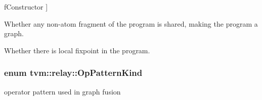 \begin{Desc}
\begin{description}
{f\+Constructor\hypertarget{namespacetvm_1_1relay_a926750aeda977340aa82bceac863fc9eaff71be930d862c312a5ae263e71167a2}{}\label{namespacetvm_1_1relay_a926750aeda977340aa82bceac863fc9eaff71be930d862c312a5ae263e71167a2}
}]\item[{\em 
f\+Match\hypertarget{namespacetvm_1_1relay_a926750aeda977340aa82bceac863fc9ea53a8eba57c4a3abd37b4c96fb98bf61b}{}\label{namespacetvm_1_1relay_a926750aeda977340aa82bceac863fc9ea53a8eba57c4a3abd37b4c96fb98bf61b}
}]\item[{\em 
f\+Graph\hypertarget{namespacetvm_1_1relay_a926750aeda977340aa82bceac863fc9eac6392a0ecc7df38dbfa282a54d3718d1}{}\label{namespacetvm_1_1relay_a926750aeda977340aa82bceac863fc9eac6392a0ecc7df38dbfa282a54d3718d1}
}]Whether any non-\/atom fragment of the program is shared, making the program a graph. \item[{\em 
f\+Let\+Rec\hypertarget{namespacetvm_1_1relay_a926750aeda977340aa82bceac863fc9eaff508e399703958af46f99ee8eb7d1a5}{}\label{namespacetvm_1_1relay_a926750aeda977340aa82bceac863fc9eaff508e399703958af46f99ee8eb7d1a5}
}]Whether there is local fixpoint in the program. \end{description}
\end{Desc}
\subsubsection[{\texorpdfstring{Op\+Pattern\+Kind}{OpPatternKind}}]{\setlength{\rightskip}{0pt plus 5cm}enum {\bf tvm\+::relay\+::\+Op\+Pattern\+Kind}}\hypertarget{namespacetvm_1_1relay_ab5f4d382bf1bee69c3e484ea6c837578}{}\label{namespacetvm_1_1relay_ab5f4d382bf1bee69c3e484ea6c837578}


operator pattern used in graph fusion 

